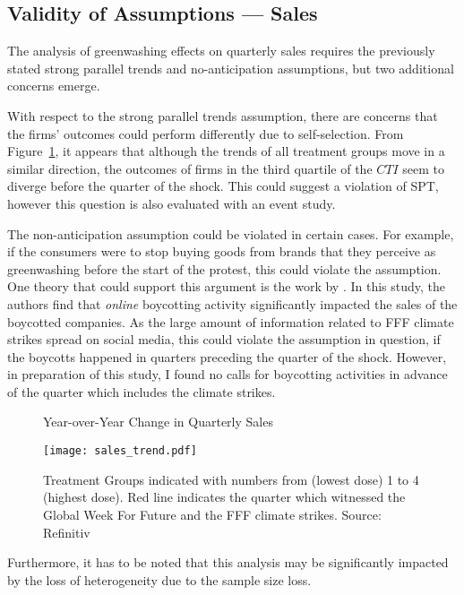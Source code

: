 \documentclass[12pt]{article}
\begin{document}
\subsection{Validity of Assumptions --- Sales}

The analysis of greenwashing effects on quarterly sales requires the previously stated strong parallel trends and no-anticipation assumptions, but two additional concerns emerge.

With respect to the strong parallel trends assumption, there are concerns that the firms' outcomes could perform differently due to self-selection. From Figure~\ref{fig:sales_trend}, it appears that although the trends of all treatment groups move in a similar direction, the outcomes of firms in the third quartile of the $CTI$ seem to diverge before the quarter of the shock. This could suggest a violation of SPT, however this question is also evaluated with an event study.

The non-anticipation assumption could be violated in certain cases. For example, if the consumers were to stop buying goods from brands that they perceive as greenwashing before the start of the protest, this could violate the assumption. One theory that could support this argument is the work by \textcite{liaukonyteFrontiersSpillingBeans2023}. In this study, the authors find that \textit{online} boycotting activity significantly impacted the sales of the boycotted companies. As the large amount of information related to FFF climate strikes spread on social media, this could violate the assumption in question, if the boycotts happened in quarters preceding the quarter of the shock. However, in preparation of this study, I found no calls for boycotting activities in advance of the quarter which includes the climate strikes. 


\begin{figure}[t]
    \caption{Year-over-Year Change in Quarterly Sales}\label{fig:sales_trend}
    \centering
    \texttt{[image: sales\_trend.pdf]}
    \captionsetup{font=footnotesize}
    \caption*{Treatment Groups indicated with numbers from (lowest dose) 1 to 4 (highest dose). Red line indicates the quarter which witnessed the Global Week For Future and the FFF climate strikes. Source: Refinitiv}
\end{figure}

Furthermore, it has to be noted that this analysis may be significantly impacted by the loss of heterogeneity due to the sample size loss.  
\end{document}
